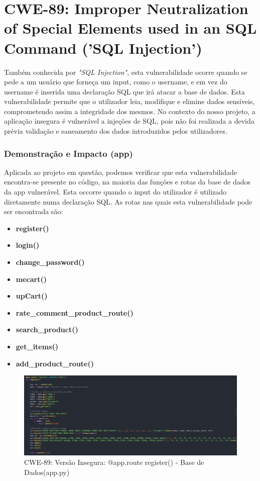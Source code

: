 %
%
\section{CWE-89: Improper Neutralization of Special Elements used in an SQL Command ('SQL Injection')}
\label{sec.cwe89}
Também conhecida por \textit{"SQL Injection"}, esta vulnerabilidade ocorre quando se pede a um usuário que forneça um input, como o username, e em vez do username é inserida uma declaração SQL que irá atacar a base de dados. 
Esta vulnerabilidade permite que o utilizador leia, modifique e elimine dados sensíveis, comprometendo assim a integridade dos mesmos. 
No contexto do nosso projeto, a aplicação insegura é vulnerável a injeções de SQL, pois não foi realizada a devida prévia validação e saneamento dos dados introduzidos pelos utilizadores. 

\subsubsection{Demonstração e Impacto (app)}

Aplicada ao projeto em questão, podemos verificar que esta vulnerabilidade encontra-se presente no código, na maioria das funções e rotas da base de dados da app vulnerável. Esta occorre quando o input do utilizador é utilizado diretamente numa declaração SQL.
As rotas nas quais esta vulnerabilidade pode ser encontrada são: 

\begin{itemize}
    \item \textbf{register()}
    \item \textbf{login()}
    \item \textbf{change\_password()}
    \item \textbf{mecart()}
    \item \textbf{upCart()}
    \item \textbf{rate\_comment\_product\_route()}
    \item \textbf{search\_product()}
    \item \textbf{get\_items()}
    \item \textbf{add\_product\_route()}
\end{itemize}


\begin{figure}[H]
  \centering
  \includegraphics[width=16cm]{images/CWE-89-Register.png}
  \caption{CWE-89: Versão Insegura: @app.route register() - Base de Dados(app.py)}
  \label{fig:cwe89-register}
\end{figure}

